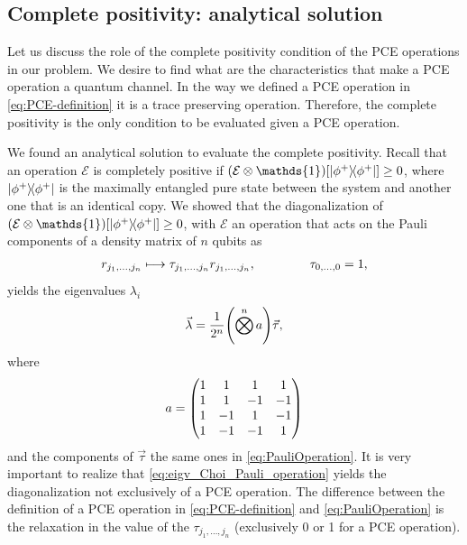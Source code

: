 \documentclass[11pt,dvipsnames]{article} %
\newcommand{\1}{\mathds{1}}
\begin{document}
\subsection*{Complete positivity: analytical solution}
Let us discuss the role of the complete positivity condition of the 
PCE operations in our problem. We desire to find what are the 
characteristics that make a PCE operation a quantum channel.
In the way we defined a PCE operation in \eqref{eq:PCE-definition} it 
is a trace preserving operation. Therefore, the complete positivity is 
the only condition to be evaluated given a PCE operation. 

We found an analytical solution to evaluate the complete positivity.
Recall that an operation $\mathcal{E}$ is completely positive if 
$\qty(\mathcal{E}\otimes\1)\qty[\dyad{\phi^+}{\phi^+}]\geq 0$,
where $\dyad{\phi^+}{\phi^+}$ is the maximally entangled pure 
state between the system and another one that is an identical copy.
We showed that the diagonalization of 
$\qty(\mathcal{E}\otimes\1)\qty[\dyad{\phi^+}{\phi^+}]\geq 0$,
with $\mathcal{E}$ an operation that acts on the Pauli components of
a density matrix of $n$ qubits as
\begin{align} \label{eq:PauliOperation}
r_{j_1,\ldots,j_n}\longmapsto \tau_{j_1,\ldots,j_n}r_{j_1,\ldots,j_n},
\hspace{1.5cm} \tau_{0,\ldots,0}=1,
\end{align}
yields the eigenvalues $\lambda_i$
\begin{align} \label{eq:eigv_Choi_Pauli_operation}
\vec{\lambda}=\frac{1}{2^n}\qty(\bigotimes^na)\vec{\tau},
\end{align}
where 
\begin{align}
a=\mqty(1&1&1&1\\1&1&-1&-1\\1&-1&1&-1\\1&-1&-1&1)
\end{align} 
and the components of $\vec{\tau}$ the same ones in 
\eqref{eq:PauliOperation}. It is very important to realize that 
\eqref{eq:eigv_Choi_Pauli_operation} yields the diagonalization
not exclusively of a PCE operation. The difference between 
the definition of a PCE operation in \eqref{eq:PCE-definition}
and \eqref{eq:PauliOperation} is the relaxation in the value of 
the $\tau_{j_1,\ldots,j_n}$ (exclusively 0 or 1 for a PCE operation). 
\end{document}
